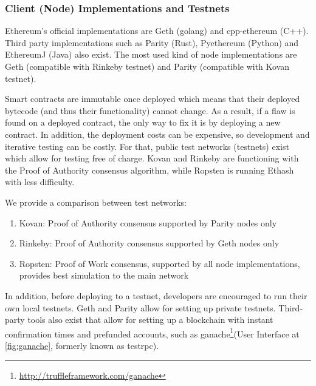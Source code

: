 \subsubsection{Client (Node) Implementations and Testnets}
Ethereum's official implementations are Geth (golang) and cpp-ethereum (C++). Third party implementations such as Parity (Rust), Pyethereum (Python) and EthereumJ (Java) also exist. The most used kind of node implementations are Geth (compatible with Rinkeby testnet) and Parity (compatible with Kovan testnet). 

Smart contracts are immutable once deployed which means that their deployed bytecode (and thus their functionality) cannot change. As a result, if a flaw is found on a deployed contract, the only way to fix it is by deploying a new contract. In addition, the deployment costs can be expensive, so development and iterative testing can be costly. For that, public test networks (testnets) exist which allow for testing free of charge. Kovan and Rinkeby are functioning with the Proof of Authority \cite{poa} consensus algorithm, while Ropsten is running Ethash \cite{ethash} with less difficulty.

We provide a comparison between test networks:
\begin{enumerate}
    \item Kovan: Proof of Authority consensus supported by Parity nodes only
    \item Rinkeby: Proof of Authority consensus supported by Geth nodes only
    \item Ropsten: Proof of Work consensus, supported by all node implementations, provides best simulation to the main network 
\end{enumerate}

In addition, before deploying to a testnet, developers are encouraged to run their own local testnets. Geth and Parity allow for setting up private testnets. Third-party tools also exist that allow for setting up a blockchain with instant confirmation times and prefunded accounts, such as ganache\footnote{\url{http://truffleframework.com/ganache}}(User Interface at \ref{fig:ganache},  formerly known as testrpc).


